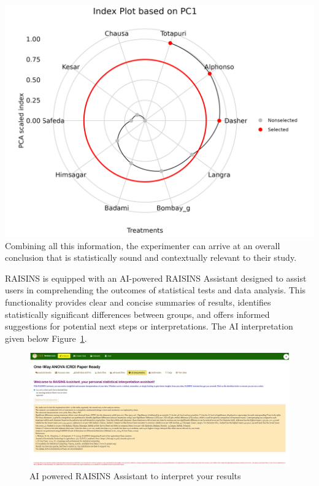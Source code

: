 \documentclass[
  letterpaper,
  DIV=11,
  numbers=noendperiod]{scrartcl}
\begin{document}
\includegraphics{Indexplot12025-10-07.webp} Combining all this
information, the experimenter can arrive at an overall conclusion that
is statistically sound and contextually relevant to their study.

RAISINS is equipped with an AI-powered RAISINS Assistant designed to
assist users in comprehending the outcomes of statistical tests and data
analysis. This functionality provides clear and concise summaries of
results, identifies statistically significant differences between
groups, and offers informed suggestions for potential next steps or
interpretations. The AI interpretation given below Figure~\ref{fig-ai}.

\begin{figure}

{\centering \includegraphics{AI interpretation.webp}

}

\caption{\label{fig-ai}AI powered RAISINS Assistant to interpret your
results}

\end{figure}
\end{document}
